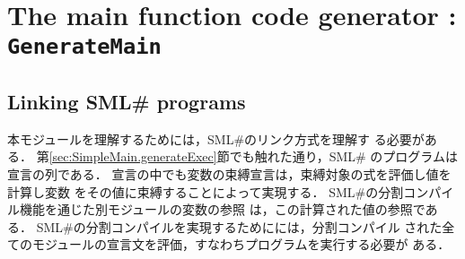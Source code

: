 \documentclass{jbook}
\newif\ifjp
\newcommand{\txt}[2]{#2}
\newcommand{\smlsharp}{SML\#}
\newcommand{\code}[1]{\mbox{\large\tt #1}}
\begin{document}
\else%
\fi%


% 
\chapter{\txt
{メイン関数コード生成モジュール：\code{GenerateMain}}
{The main function code generator : \code{GenerateMain}}
}
\label{chap:GenerateMain}

\ifjp%
\begin{enumerate}
\item ソースロケーションとファイル構成
ディレクトリ \code{src/compiler/generatemain}下の以下のファイルからなる．
\begin{itemize}
\item \code{GenerateMain.sml} 処理本体
\item \code{GenerateMainError.ppg} エラーメッセージ定義
\end{itemize}

\item 機能概要 
\begin{enumerate}
\item 各オブジェクトファイルのメイン関数名の生成
\item 各オブジェクトファイルのエントリコード生成
\item トップレベルファイルに対するメイン関数呼び出しコードの生成
\end{enumerate}

\item 他モジュールとのインターフェイス
\begin{itemize}
\item \code{src/compiler/toplevel2/main/Top.sml}から呼び出される．
\end{itemize}
\end{enumerate}
\else%
\fi%

\section{\txt{\smlsharp{}プログラムのリンク方式}{Linking \smlsharp{} programs}}
\ifjp%

	本モジュールを理解するためには，\smlsharp{}のリンク方式を理解す
る必要がある．
	第\ref{sec:SimpleMain.generateExec}節でも触れた通り，\smlsharp{}
のプログラムは宣言の列である．
	宣言の中でも変数の束縛宣言は，束縛対象の式を評価し値を計算し変数
をその値に束縛することによって実現する．
	\smlsharp{}の分割コンパイル機能を通じた別モジュールの変数の参照
は，この計算された値の参照である．
	\smlsharp{}の分割コンパイルを実現するためにには，分割コンパイル
された全てのモジュールの宣言文を評価，すなわちプログラムを実行する必要が
ある．
\end{document}
